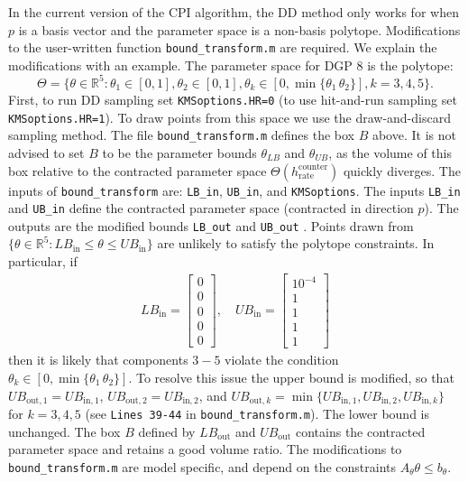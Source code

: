 \documentclass[12pt]{article}
\def\code#1{\texttt{#1}}
\begin{document}
\begin{appendices}
In the current version of the CPI algorithm, the DD method only works for when $p$ is a basis vector and the parameter space is a non-basis polytope.  Modifications to the user-written function  \code{bound\_transform.m} are required.  We explain the modifications with an example.  The parameter space for DGP $8$ is the polytope:
\[
\Theta = \{\theta \in \mathbb{R}^5 : \theta_1 \in [0,1], \theta_2 \in [0,1],  \theta_k \in [0,\min\{\theta_1\,\theta_2\}], k=3,4,5\}.
\]
First, to run DD sampling set \code{KMSoptions.HR=0} (to use hit-and-run sampling set \code{KMSoptions\-.HR=1}).
To draw points from this space we use the draw-and-discard sampling method.  The file \code{bound\_transform.m} defines the box $B$ above.  It is not advised to set $B$ to be the parameter bounds $\theta_{LB}$ and $\theta_{UB}$, as the volume of this box relative to the contracted parameter space $\Theta(h_{\text{rate}}^{\text{counter}})$ quickly diverges.  The inputs of \code{bound\_transform} are: \code{LB\_in}, \code{UB\_in}, and \code{KMSoptions}.  The inputs \code{LB\_in} and \code{UB\_in} define the contracted parameter space (contracted in direction $p$). The outputs are the modified bounds \code{LB\_out} and \code{UB\_out} .  Points drawn from  $\{\theta \in \mathbb{R}^5 : LB_{\text{in}} \leq \theta \leq UB_{\text{in}}\}$ are unlikely to satisfy the polytope constraints.  In particular, if
\begin{align*}
 LB_{\text{in}} =
 \begin{bmatrix}
 0 \\
 0 \\
 0 \\
 0 \\
 0
 \end{bmatrix},
  \quad
   UB_{\text{in}} =
 \begin{bmatrix}
 10^{-4} \\
 1 \\
 1 \\
 1 \\
 1
 \end{bmatrix}
\end{align*}
then it is likely that components $3-5$ violate the condition $\theta_k \in [0,\min\{\theta_1\,\theta_2\}]$.  To resolve this issue the upper bound is modified, so that  $UB_{\text{out},1} = UB_{\text{in},1}$, $UB_{\text{out},2} = UB_{\text{in},2}$, and $UB_{\text{out},k} = \min\{UB_{\text{in},1},UB_{\text{in},2},UB_{\text{in},k}\}$ for $k=3,4,5$ (see \code{Lines 39-44} in  \code{bound\_transform.m}).  The lower bound is unchanged. The box $B$ defined by $LB_{\text{out}}$ and $UB_{\text{out}}$ contains the contracted parameter space and retains a good volume ratio.
The modifications to  \code{bound\_trans\-form.m} are model specific, and depend on the constraints $A_{\theta} \theta \leq b_{\theta}$.


\end{appendices}
\end{document}
